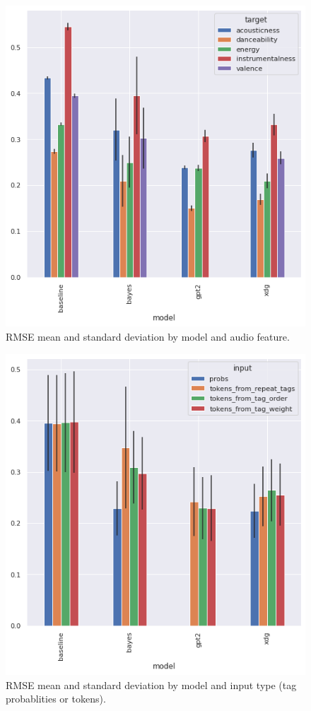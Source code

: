 \documentclass[sn-mathphys]{sn-jnl}%
\theoremstyle{thmstyleone}%
\theoremstyle{thmstyletwo}%
\theoremstyle{thmstylethree}%
\begin{document}
\begin{figure}[h!]
      \centering
      \includegraphics[width=1\textwidth]{images/rmse_by_model_and_feature.png}
      \caption{RMSE mean and standard deviation by model and audio feature.}
      \label{fig:rmse_by_model_and_feature}
\end{figure}


\begin{figure}[h!]
      \centering
      \includegraphics[width=1\textwidth]{images/rmse_by_model_and_input.png}
      \caption{RMSE mean and standard deviation by model and input type (tag probablities or tokens).}
      \label{fig:rmse_by_model_and_input}
\end{figure}
\end{document}
